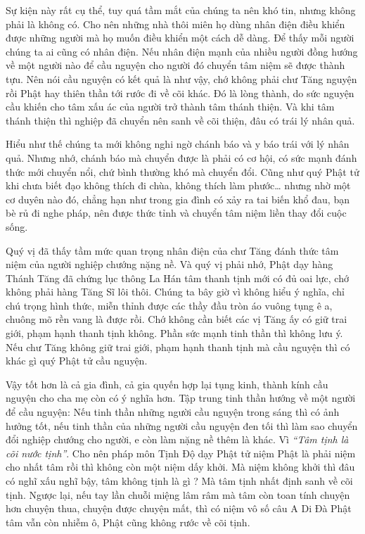 \documentclass[
  12pt,
  oneside]{book}
\begin{document}
Sự kiện này rất cụ thể, tuy quá tầm mắt của chúng ta nên khó tin, nhưng không phải là không có. Cho nên những nhà thôi miên họ dùng nhân điện điều khiển được những người mà họ muốn điều khiển một cách dễ dàng. Để thấy mỗi người chúng ta ai cũng có nhân điện. Nếu nhân điện mạnh của nhiều người đồng hướng về một người nào để cầu nguyện cho người đó chuyển tâm niệm sẽ được thành tựu. Nên nói cầu nguyện có kết quả là như vậy, chớ không phải chư Tăng nguyện rồi Phật hay thiên thần tới rước đi về cõi khác. Đó là lòng thành, do sức nguyện cầu khiến cho tâm xấu ác của người trở thành tâm thánh thiện. Và khi tâm thánh thiện thì nghiệp đã chuyển nên sanh về cõi thiện, đâu có trái lý nhân quả.

Hiểu như thế chúng ta mới không nghi ngờ chánh báo và y báo trái với lý nhân quả. Nhưng nhớ, chánh báo mà chuyển được là phải có cơ hội, có sức mạnh đánh thức mới chuyển nổi, chứ bình thường khó mà chuyển đổi. Cũng như quý Phật tử khi chưa biết đạo không thích đi chùa, không thích làm phước\ldots{} nhưng nhờ một cơ duyên nào đó, chẳng hạn như trong gia đình có xảy ra tai biến khổ đau, bạn bè rủ đi nghe pháp, nên được thức tỉnh và chuyển tâm niệm liền thay đổi cuộc sống.

Quý vị đã thấy tầm mức quan trọng nhân điện của chư Tăng đánh thức tâm niệm của người nghiệp chướng nặng nề. Và quý vị phải nhớ, Phật dạy hàng Thánh Tăng đã chứng lục thông La Hán tâm thanh tịnh mới có đủ oai lực, chớ không phải hàng Tăng Sĩ lôi thôi. Chúng ta bây giờ vì không hiểu ý nghĩa, chỉ chú trọng hình thức, miễn thỉnh được các thầy đầu tròn áo vuông tụng ê a, chuông mõ rền vang là được rồi. Chớ không cần biết các vị Tăng ấy có giữ trai giới, phạm hạnh thanh tịnh không. Phần sức mạnh tinh thần thì không lưu ý. Nếu chư Tăng không giữ trai giới, phạm hạnh thanh tịnh mà cầu nguyện thì có khác gì quý Phật tử cầu nguyện.

Vậy tốt hơn là cả gia đình, cả gia quyến hợp lại tụng kinh, thành kính cầu nguyện cho cha mẹ còn có ý nghĩa hơn. Tập trung tinh thần hướng về một người để cầu nguyện: Nếu tinh thần những người cầu nguyện trong sáng thì có ảnh hưởng tốt, nếu tinh thần của những người cầu nguyện đen tối thì làm sao chuyển đổi nghiệp chướng cho người, e còn làm nặng nề thêm là khác. Vì \emph{``Tâm tịnh là cõi nước tịnh''}. Cho nên pháp môn Tịnh Độ dạy Phật tử niệm Phật là phải niệm cho nhất tâm rồi thì không còn một niệm dấy khởi. Mà niệm không khởi thì đâu có nghĩ xấu nghĩ bậy, tâm không tịnh là gì ? Mà tâm tịnh nhất định sanh về cõi tịnh. Ngược lại, nếu tay lần chuỗi miệng lâm râm mà tâm còn toan tính chuyện hơn chuyện thua, chuyện được chuyện mất, thì có niệm vô số câu A Di Đà Phật tâm vẫn còn nhiễm ô, Phật cũng không rước về cõi tịnh.
\end{document}
